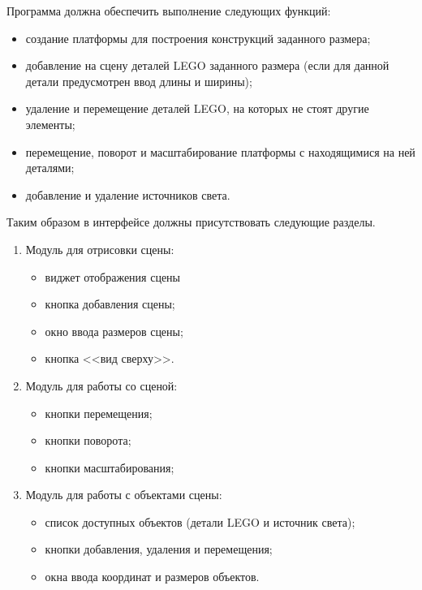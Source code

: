 Программа должна обеспечить выполнение следующих функций:
\begin{itemize}[label=---]
    \item создание платформы для построения конструкций заданного размера;
    \item добавление на сцену деталей LEGO заданного размера (если для данной детали предусмотрен ввод длины и ширины);
    \item удаление и перемещение деталей LEGO, на которых не стоят другие элементы;
    \item перемещение, поворот и масштабирование платформы с находящимися на ней деталями;
    \item добавление и удаление источников света.
\end{itemize}

\clearpage
Таким образом в интерфейсе должны присутствовать следующие разделы.
\begin{enumerate}[label=\arabic*)]
    \item Модуль для отрисовки сцены:
        \begin{itemize}[label=---]
            \item виджет отображения сцены
            \item кнопка добавления сцены;
            \item окно ввода размеров сцены;
            \item кнопка <<вид сверху>>.
        \end{itemize}
    \item Модуль для работы со сценой:
        \begin{itemize}[label=---]
            \item кнопки перемещения;
            \item кнопки поворота;
            \item кнопки масштабирования;
        \end{itemize}
    \item Модуль для работы с объектами сцены:
        \begin{itemize}[label=---]
            \item список доступных объектов (детали LEGO и источник света);
            \item кнопки добавления, удаления и перемещения;
            \item окна ввода координат и размеров объектов.
        \end{itemize}
\end{enumerate}